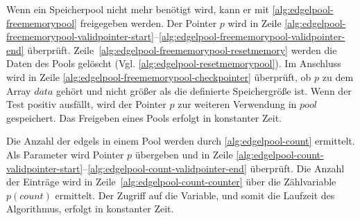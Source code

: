 

Wenn ein Speicherpool nicht mehr benötigt wird, kann er mit \autoref{alg:edgelpool-freememorypool} freigegeben werden.
 Der Pointer $p$ wird in Zeile
 \ref{alg:edgelpool-freememorypool-validpointer-start}--\ref{alg:edgelpool-freememorypool-validpointer-end} überprüft.
 Zeile~\ref{alg:edgelpool-freememorypool-resetmemory} werden die Daten des Pools gelöscht
 (Vgl. \autoref{alg:edgelpool-resetmemorypool}). Im Anschluss wird in Zeile
 \ref{alg:edgelpool-freememorypool-checkpointer} überprüft, ob $p$ zu dem Array $\mathit{data}$ gehört und nicht größer
 als die definierte Speichergröße ist. Wenn der Test positiv ausfällt, wird der Pointer $p$ zur weiteren Verwendung in
 $\mathit{pool}$ gespeichert. Das Freigeben eines Pools erfolgt in konstanter Zeit.



Die Anzahl der \glspl{edgel} in einem Pool werden durch \autoref{alg:edgelpool-count} ermittelt. Als Parameter wird
 Pointer $p$ übergeben und in Zeile
 \ref{alg:edgelpool-count-validpointer-start}--\ref{alg:edgelpool-count-validpointer-end} überprüft. Die Anzahl der
 Einträge wird in Zeile~\ref{alg:edgelpool-count-counter} über die Zählvariable $p(\mathit{count})$ ermittelt. Der
 Zugriff auf die Variable, und somit die Laufzeit des Algorithmus, erfolgt in konstanter Zeit.



